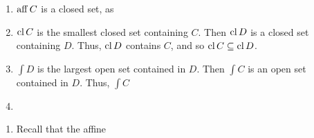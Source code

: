 \begin{exercises}
\item
  \begin{enumerate}
  \item $\operatorname*{aff} C$ is a closed set, as  
  \item $\operatorname*{cl} C$ is the smallest closed set containing $C$.  Then $\operatorname*{cl}
    D$ is a closed set containing $D$.  Thus, $\operatorname*{cl} D$ contains $C$,
    and so $\operatorname*{cl} C \subseteq \operatorname*{cl} D$.
  \item $\int D$ is the largest open set contained in $D$. Then $\int
    C$ is an open set contained in $D$.  Thus, $\int C$ 

  \item {}
  \end{enumerate}
\item
  \begin{enumerate}
  \item Recall that the affine
  \end{enumerate}

\end{exercises}


